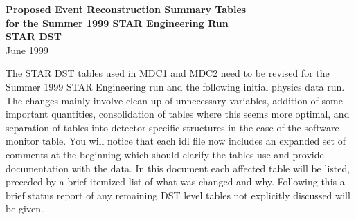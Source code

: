 \setlength{\topmargin}{0.0pt}
\setlength{\headheight}{0.0pt}
\setlength{\headsep}{0.0pt}
\setlength{\footheight}{0.0pt}
\setlength{\textheight}{8.7truein}
\setlength{\oddsidemargin}{17.0pt}
\setlength{\evensidemargin}{17.0pt}
\setlength{\textwidth}{6.0truein}
\renewcommand{\baselinestretch}{1}


\begin{centering}
{\Large\bf Proposed Event Reconstruction Summary Tables}  \\
\vspace{0.2in}
{\Large\bf for the Summer 1999 STAR Engineering Run}  \\
\vspace{0.2in}
{\LARGE\bf STAR DST}  \\
\vspace{0.2in}
{\large June 1999}  \\
\vspace{0.3in}

\end{centering}

The STAR DST tables used in MDC1 and MDC2 need to be revised for the
Summer 1999 STAR Engineering run and the following initial physics data
run.  The changes mainly involve clean up of unnecessary variables,
addition of some important quantities, consolidation of tables where
this seems more optimal, and separation of tables into detector specific
structures in the case of the software monitor table.  You will notice 
that each idl file now includes an expanded set of comments at the
beginning which should clarify the tables use and provide documentation
with the data.  In this document
each affected table will be listed, preceded by a brief itemized list
of what was changed and why. 
Following this a brief status report of any
remaining DST level tables not explicitly discussed will be given.

\vspace{0.1in}
\vspace{0.05in}


